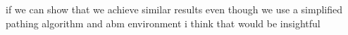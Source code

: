 \documentclass[12pt,letterpaper]{article}
\begin{document}
if we can show that we achieve similar results even though we use a simplified pathing algorithm and abm environment i think that would be insightful


%
%
%
%
%
%
%
%
%
\end{document}
